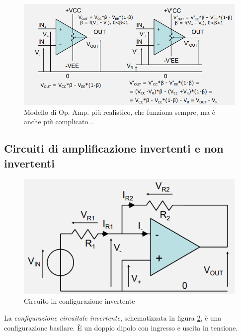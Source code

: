 \documentclass{article}
\begin{document}
\begin{figure}[h]
  \centering
  \includegraphics[scale=0.57]{IM_amplificatore_operazionale_reale}
  \caption{Modello di Op. Amp. più realistico, che funziona sempre, ma è anche più complicato...}
  \label{Schema_amplificatore_operazionale_reale}
\end{figure}







\clearpage
\subsection{Circuiti di amplificazione invertenti e non invertenti}

\begin{figure}[h]
  \centering
  \includegraphics[scale=0.7]{IM_circuito_invertente}
  \caption{Circuito in configurazione invertente}
  \label{Schema_circuito_invertente}
\end{figure}

La \textit{configurazione circuitale invertente}, schematizzata in figura \ref{Schema_circuito_invertente}, è una configurazione basilare. È un doppio dipolo con ingresso e uscita in tensione. 
\end{document}
